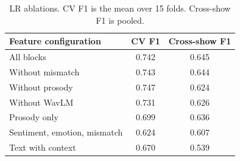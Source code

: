 \begin{table}[t]
\caption{LR ablations. CV F1 is the mean over 15 folds. Cross-show F1 is pooled.}
\label{tab:ablations}
\centering
\begin{tabular}{lcc}
\hline
Feature configuration & CV F1 & Cross-show F1 \\
\hline
All blocks & 0.742 & 0.645 \\
Without mismatch & 0.743 & 0.644 \\
Without prosody & 0.747 & 0.624 \\
Without WavLM & 0.731 & 0.626 \\
Prosody only & 0.699 & 0.636 \\
Sentiment, emotion, mismatch & 0.624 & 0.607 \\
Text with context & 0.670 & 0.539 \\
\hline
\end{tabular}
\end{table}

